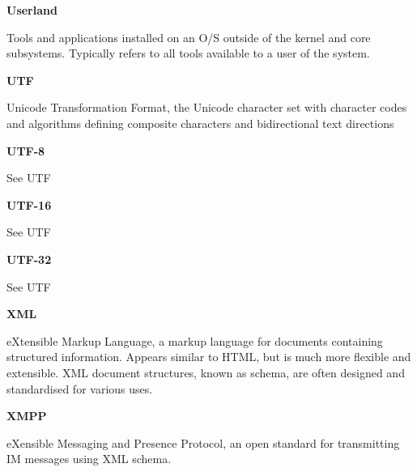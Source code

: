\textbf{Userland}

Tools and applications installed on an O/S outside of the kernel and
core subsystems. Typically refers to all tools available to a user of
the system.

\textbf{UTF}

Unicode Transformation Format, the Unicode character set with character 
codes and algorithms defining composite characters and bidirectional
text directions

\textbf{UTF-8}

See UTF

\textbf{UTF-16}

See UTF

\textbf{UTF-32}

See UTF

\textbf{XML}

eXtensible Markup Language, a markup language for documents containing
structured information. Appears similar to HTML, but is much more
flexible and extensible. XML document structures, known as schema, are
often designed and standardised for various uses.

\textbf{XMPP}

eXensible Messaging and Presence Protocol, an open standard for
transmitting IM messages using XML schema.
